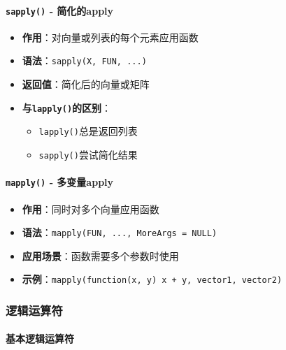 \documentclass[
]{book}
\providecommand{\tightlist}{%
  \setlength{\itemsep}{0pt}\setlength{\parskip}{0pt}}
\begin{document}
\hypertarget{sapply---ux7b80ux5316ux7684apply}{%
\paragraph{\texorpdfstring{\texttt{sapply()} - 简化的apply}{sapply() - 简化的apply}}\label{sapply---ux7b80ux5316ux7684apply}}

\begin{itemize}
\tightlist
\item
  \textbf{作用}：对向量或列表的每个元素应用函数
\item
  \textbf{语法}：\texttt{sapply(X,\ FUN,\ ...)}
\item
  \textbf{返回值}：简化后的向量或矩阵
\item
  \textbf{与\texttt{lapply()}的区别}：

  \begin{itemize}
  \tightlist
  \item
    \texttt{lapply()}总是返回列表
  \item
    \texttt{sapply()}尝试简化结果
  \end{itemize}
\end{itemize}

\hypertarget{mapply---ux591aux53d8ux91cfapply}{%
\paragraph{\texorpdfstring{\texttt{mapply()} - 多变量apply}{mapply() - 多变量apply}}\label{mapply---ux591aux53d8ux91cfapply}}

\begin{itemize}
\tightlist
\item
  \textbf{作用}：同时对多个向量应用函数
\item
  \textbf{语法}：\texttt{mapply(FUN,\ ...,\ MoreArgs\ =\ NULL)}
\item
  \textbf{应用场景}：函数需要多个参数时使用
\item
  \textbf{示例}：\texttt{mapply(function(x,\ y)\ x\ +\ y,\ vector1,\ vector2)}
\end{itemize}

\hypertarget{ux903bux8f91ux8fd0ux7b97ux7b26}{%
\subsubsection{逻辑运算符}\label{ux903bux8f91ux8fd0ux7b97ux7b26}}

\hypertarget{ux57faux672cux903bux8f91ux8fd0ux7b97ux7b26}{%
\paragraph{基本逻辑运算符}\label{ux57faux672cux903bux8f91ux8fd0ux7b97ux7b26}}
\end{document}
